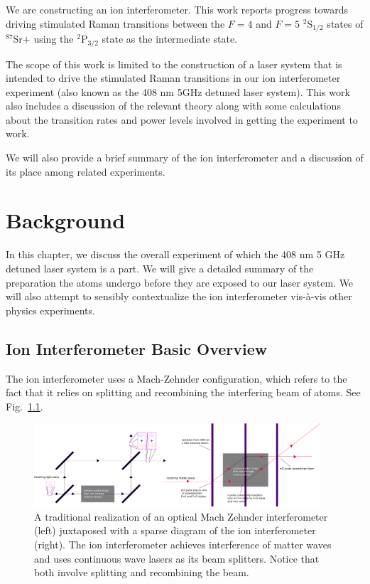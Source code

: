We are constructing an ion interferometer. This work reports progress towards driving stimulated Raman transitions between the $F=4$ and $F=5$ $^2$S$_{1/2}$ states of $^{87}$Sr$+$ using the $^2$P$_{3/2}$ state as the intermediate state.

The scope of this work is limited to the construction of a laser system that is intended to drive the stimulated Raman transitions in our ion interferometer experiment (also known as the 408 nm 5GHz detuned laser system).
This work also includes a discussion of the relevant theory along with some calculations about the transition rates and power levels involved in getting the experiment to work. 

We will also provide a brief summary of the ion interferometer and a discussion of its place among related experiments. 

\chapter{Background}
In this chapter, we discuss the overall experiment of which the 408 nm 5 GHz detuned laser system is a part. We will give a detailed summary of the preparation the atoms undergo before they are exposed to our laser system. We will also attempt to sensibly contextualize the ion interferometer vis-\`a-vis other physics experiments. 

\section{Ion Interferometer Basic Overview}
The ion interferometer uses a Mach-Zehnder configuration, which refers to the fact that it relies on splitting and recombining the interfering beam of atoms. See Fig.\ \ref{mach-zehnder-fig}. 


\begin{figure}
\centerline{
\includegraphics[width=0.95\textwidth]{mach-zehnder_0v2}}
\caption[Optical and Matterwave Mach Zehnder interferometers]{\label{mach-zehnder-fig}A traditional realization of an optical Mach Zehnder interferometer (left) juxtaposed with a sparse diagram of the ion interferometer (right). The ion interferometer achieves interference of matter waves and uses continuous wave lasers as its beam splitters. Notice that both involve splitting and recombining the beam. }
\end{figure}



